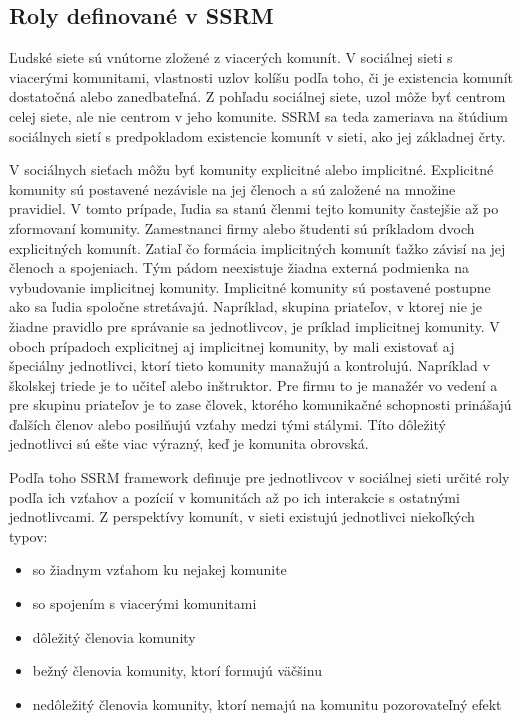 \documentclass[slovak,master,public,dept460,male,cpdeclaration,oneside]{diploma}
\begin{document}
\subsection{Roly definované v SSRM}
Ľudské siete sú vnútorne zložené z viacerých komunít. V sociálnej sieti s viacerými komunitami, vlastnosti uzlov kolíšu podľa toho, či je existencia komunít dostatočná alebo zanedbateľná. Z pohľadu sociálnej siete, uzol môže byť centrom celej siete, ale nie centrom v jeho komunite. SSRM sa teda zameriava na štúdium sociálnych sietí s predpokladom existencie komunít v sieti, ako jej základnej črty.

V sociálnych sieťach môžu byť komunity explicitné alebo implicitné. Explicitné komunity sú postavené nezávisle na jej členoch a sú založené na množine pravidiel. V tomto prípade, ľudia sa stanú členmi tejto komunity častejšie až po zformovaní komunity. Zamestnanci firmy alebo študenti sú príkladom dvoch explicitných komunít. Zatiaľ čo formácia implicitných komunít ťažko závisí na jej členoch a spojeniach. Tým pádom neexistuje žiadna externá podmienka na vybudovanie implicitnej komunity. Implicitné komunity sú postavené postupne ako sa ľudia spoločne stretávajú. Napríklad, skupina priateľov, v ktorej nie je žiadne pravidlo pre správanie sa jednotlivcov, je príklad implicitnej komunity. V oboch prípadoch explicitnej aj implicitnej komunity, by mali existovať aj špeciálny jednotlivci, ktorí tieto komunity manažujú a kontrolujú. Napríklad v školskej triede je to učiteľ alebo inštruktor. Pre firmu to je manažér vo vedení a pre skupinu priateľov je to zase človek, ktorého komunikačné schopnosti prinášajú ďalších členov alebo posilňujú vzťahy medzi tými stálymi. Títo dôležitý jednotlivci sú ešte viac výrazný, keď je komunita obrovská.


Podľa toho SSRM framework definuje pre jednotlivcov v sociálnej sieti určité roly podľa ich vzťahov a pozícií v komunitách až po ich interakcie s ostatnými jednotlivcami. Z perspektívy komunít, v sieti existujú jednotlivci niekoľkých typov:

\begin{itemize}
\item so žiadnym vzťahom ku nejakej komunite
\item so spojením s viacerými komunitami
\item dôležitý členovia komunity
\item bežný členovia komunity, ktorí formujú väčšinu
\item nedôležitý členovia komunity, ktorí nemajú na komunitu pozorovateľný efekt
\end{itemize} 
\end{document}
